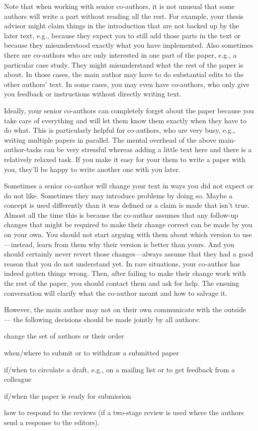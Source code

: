 \documentclass[12pt]{article}
\begin{document}
Note that when working with senior co-authors, it is not unusual that some authors will write a part without reading all the rest.
For example, your thesis advisor might claim things in the introduction that are not backed up by the later text, e.g., because they expect you to still add those parts in the text or because they misunderstood exactly what you have implemented.
Also sometimes there are co-authors who are only interested in one part of the paper, e.g., a particular case study.
They might misunderstand what the rest of the paper is about.
In those cases, the main author may have to do substantial edits to the other authors' text.
In some cases, you may even have co-authors, who only give you feedback or instructions without directly writing text.

Ideally, your senior co-authors can completely forget about the paper because you take care of everything and will let them know them exactly when they have to do what.
This is particularly helpful for co-authors, who are very busy, e.g., writing multiple papers in parallel.
The mental overhead of the above main-author-tasks can be very stressful whereas adding a little text here and there is a relatively relaxed task.
If you make it easy for your them to write a paper with you, they'll be happy to write another one with you later.

Sometimes a senior co-author will change your text in ways you did not expect or do not like.
Sometimes they may introduce problems by doing so.
Maybe a concept is used differently than it was defined or a claim is made that isn't true.
Almost all the time this is because the co-author assumes that any follow-up changes that might be required to make their change correct can be made by you on your own.
You should not start arguing with them about which version to use---instead, learn from them why their version is better than yours.
And you should certainly never revert those changes---always assume that they had a good reason that you do not understand yet.
In rare situations, your co-author has indeed gotten things wrong.
Then, after failing to make their change work with the rest of the paper, you should contact them and ask for help.
The ensuing conversation will clarify what the co-author meant and how to salvage it.

However, the main author may not on their own communicate with the outside --- the following decisions should be made jointly by all authors:
\begin{compactitem}
 \item change the set of authors or their order
 \item when/where to submit or to withdraw a submitted paper
 \item if/when to circulate a draft, e.g., on a mailing list or to get feedback from a colleague
 \item if/when the paper is ready for submission
 \item how to respond to the reviews (if a two-stage review is used where the authors send a response to the editors).
\end{compactitem}
\end{document}
